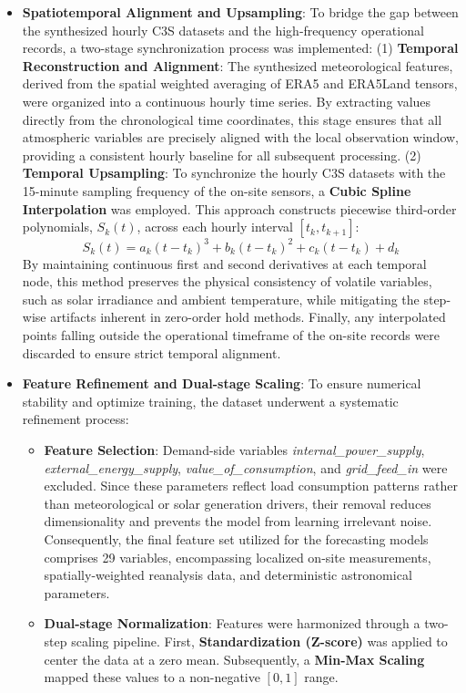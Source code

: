 \documentclass[conference]{IEEEtran}
\begin{document}
\begin{itemize}
		\item \textbf{Spatiotemporal Alignment and Upsampling}: To bridge the gap between the synthesized hourly C3S datasets and the high-frequency operational records, a two-stage synchronization process was implemented: (1) \textbf{Temporal Reconstruction and Alignment}: The synthesized meteorological features, derived from the spatial weighted averaging of ERA5 and ERA5Land tensors, were organized into a continuous hourly time series. By extracting values directly from the chronological time coordinates, this stage ensures that all atmospheric variables are precisely aligned with the local observation window, providing a consistent hourly baseline for all subsequent processing. (2) \textbf{Temporal Upsampling}: To synchronize the hourly C3S datasets with the 15-minute sampling frequency of the on-site sensors, a \textbf{Cubic Spline Interpolation} was employed. This approach constructs piecewise third-order polynomials, $S_k(t)$, across each hourly interval $[t_k, t_{k+1}]$:
		\begin{equation*}
			S_k(t) = a_k(t - t_k)^3 + b_k(t - t_k)^2 + c_k(t - t_k) + d_k
		\end{equation*}
		By maintaining continuous first and second derivatives at each temporal node, this method preserves the physical consistency of volatile variables, such as solar irradiance and ambient temperature, while mitigating the step-wise artifacts inherent in zero-order hold methods. Finally, any interpolated points falling outside the operational timeframe of the on-site records were discarded to ensure strict temporal alignment.
		\item \textbf{Feature Refinement and Dual-stage Scaling}: To ensure numerical stability and optimize training, the dataset underwent a systematic refinement process:
		\begin{itemize}
			\item \textbf{Feature Selection}: Demand-side variables \textit{internal\_power\_supply}, \textit{external\_energy\_supply},  \textit{value\_of\_consumption}, and \textit{grid\_feed\_in} were excluded. Since these parameters reflect load consumption patterns rather than meteorological or solar generation drivers, their removal reduces dimensionality and prevents the model from learning irrelevant noise. Consequently, the final feature set utilized for the forecasting models comprises 29 variables, encompassing localized on-site measurements, spatially-weighted reanalysis data, and deterministic astronomical parameters.
			\item \textbf{Dual-stage Normalization}: Features were harmonized through a two-step scaling pipeline. First, \textbf{Standardization (Z-score)} was applied to center the data at a zero mean. Subsequently, a \textbf{Min-Max Scaling} mapped these values to a non-negative $[0, 1]$ range.

\end{itemize}
\end{itemize}
\end{document}
